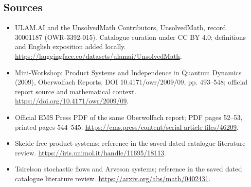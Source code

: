 \documentclass[11pt]{article}
\begin{document}
\subsection{Sources}
\begin{itemize}
\item[\hypertarget{source:30001187:1}{S1}] ULAM.AI and the UnsolvedMath Contributors, UnsolvedMath, record 30001187 (OWR-3392-015). Catalogue curation under CC BY 4.0; definitions and English exposition added locally.
\url{https://huggingface.co/datasets/ulamai/UnsolvedMath}.
\item[\hypertarget{source:30001187:2}{S2}] Mini-Workshop: Product Systems and Independence in Quantum Dynamics (2009), Oberwolfach Reports, DOI 10.4171/owr/2009/09, pp. 493--548; official report source and mathematical context.
\url{https://doi.org/10.4171/owr/2009/09}.
\item[\hypertarget{source:30001187:3}{S3}] Official EMS Press PDF of the same Oberwolfach report; PDF pages 52--53, printed pages 544--545.
\url{https://ems.press/content/serial-article-files/46209}.
\item[\hypertarget{source:30001187:4}{S4}] Skeide free product systems; reference in the saved dated catalogue literature review.
\url{https://iris.unimol.it/handle/11695/18113}.
\item[\hypertarget{source:30001187:5}{S5}] Tsirelson stochastic flows and Arveson systems; reference in the saved dated catalogue literature review.
\url{https://arxiv.org/abs/math/0402431}.
\end{itemize}
\label{end:30001187}
\end{document}
